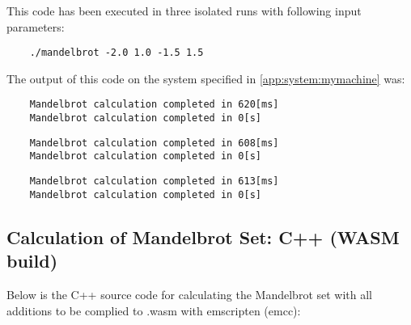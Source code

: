 This code has been executed in three isolated runs with following input parameters:
\begin{lstlisting}
    ./mandelbrot -2.0 1.0 -1.5 1.5
\end{lstlisting}

The output of this code on the system specified in \ref{app:system:mymachine} was:
\begin{lstlisting}
    Mandelbrot calculation completed in 620[ms]
    Mandelbrot calculation completed in 0[s]
\end{lstlisting}
\begin{lstlisting}
    Mandelbrot calculation completed in 608[ms]
    Mandelbrot calculation completed in 0[s]
\end{lstlisting}
\begin{lstlisting}
    Mandelbrot calculation completed in 613[ms]
    Mandelbrot calculation completed in 0[s]
\end{lstlisting}

\subsection{Calculation of Mandelbrot Set: C++ (WASM build)}
\label{app:code:mandelbrot2}
Below is the C++ source code for calculating the Mandelbrot set with all additions to be complied to .wasm with emscripten (emcc):

